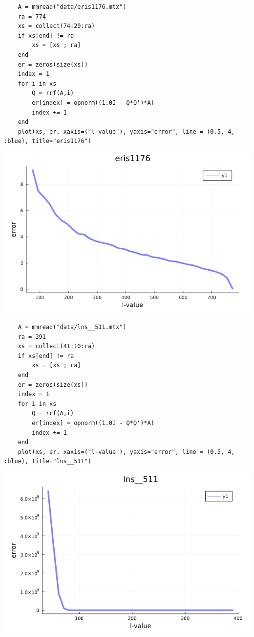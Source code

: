 \documentclass[11pt,a4paper]{article}
\theoremstyle{definition}
\begin{document}
	\begin{lstlisting}
	A = mmread("data/eris1176.mtx")
	ra = 774
	xs = collect(74:20:ra)
	if xs[end] != ra
	    xs = [xs ; ra]
	end
	er = zeros(size(xs))
	index = 1
	for i in xs 
	    Q = rrf(A,i)
	    er[index] = opnorm((1.0I - Q*Q')*A)
	    index += 1
	end
	plot(xs, er, xaxis=("l-value"), yaxis="error", line = (0.5, 4, :blue), title="eris1176")
	\end{lstlisting}

	\includegraphics[scale=0.5]{images/4.1_3.png}
	\begin{lstlisting}
	A = mmread("data/lns__511.mtx")
	ra = 391
	xs = collect(41:10:ra)
	if xs[end] != ra
	    xs = [xs ; ra]
	end
	er = zeros(size(xs))
	index = 1
	for i in xs 
	    Q = rrf(A,i)
	    er[index] = opnorm((1.0I - Q*Q')*A)
	    index += 1
	end
	plot(xs, er, xaxis=("l-value"), yaxis="error", line = (0.5, 4, :blue), title="lns__511")
	\end{lstlisting}
	\includegraphics[scale=0.5]{images/4.1_4.png}
\end{document}
